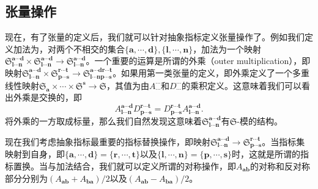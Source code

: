 \subsection{张量操作}

现在，有了张量的定义后，我们就可以针对抽象指标定义张量操作了。例如我们定义加法为，对两个不相交的集合$\{\boldsymbol{a} ,\cdots ,\boldsymbol{d}\} ,\{\boldsymbol{l} ,\cdots ,\boldsymbol{n}\}$，加法为一个映射$\mathfrak{S}_{\boldsymbol{l} \cdots \boldsymbol{n}}^{\boldsymbol{a} \cdots \boldsymbol{d}} \times \mathfrak{S}_{\boldsymbol{l} \cdots \boldsymbol{n}}^{\boldsymbol{a} \cdots \boldsymbol{d}}\rightarrow \mathfrak{S}_{\boldsymbol{l} \cdots \boldsymbol{n}}^{\boldsymbol{a} \cdots \boldsymbol{d}}$。一个重要的运算是所谓的外乘（outer multiplication），即映射$\mathfrak{S}_{\boldsymbol{l} \cdots \boldsymbol{n}}^{\boldsymbol{a} \cdots \boldsymbol{d}} \times \mathfrak{S}_{\boldsymbol{p} \cdots \boldsymbol{s}}^{\boldsymbol{r} \cdots \boldsymbol{t}}\rightarrow \mathfrak{S}_{\boldsymbol{l} \cdots \boldsymbol{np} \cdots \boldsymbol{s}}^{\boldsymbol{a} \cdots \boldsymbol{dr} \cdots \boldsymbol{t}}$。如果用第一类张量的定义，即外乘定义了一个多重线性映射$\mathfrak{S}_{\boldsymbol{a}} \times \cdots \times \mathfrak{S}^{\boldsymbol{s}}\rightarrow \mathfrak{S}$，其值为由$A_{\cdots }^{\cdots }$和$D_{\cdots }^{\cdots }$的乘积定义。这意味着我们可以看出外乘是交换的，即
\begin{equation*}
	A_{\boldsymbol{l} \cdots \boldsymbol{n}}^{\boldsymbol{a} \cdots \boldsymbol{d}} D_{\boldsymbol{p} \cdots \boldsymbol{s}}^{\boldsymbol{r} \cdots \boldsymbol{t}} =D_{\boldsymbol{p} \cdots \boldsymbol{s}}^{\boldsymbol{r} \cdots \boldsymbol{t}} A_{\boldsymbol{l} \cdots \boldsymbol{n}}^{\boldsymbol{a} \cdots \boldsymbol{d}} .
\end{equation*}
将外乘的一方取成标量，那么我们自然发现这意味着$\mathfrak{S}_{\boldsymbol{l} \cdots \boldsymbol{n}}^{\boldsymbol{a} \cdots \boldsymbol{d}}$有$\mathfrak{S}$-模的结构。



现在我们考虑抽象指标最重要的指标替换操作，即映射$\mathfrak{S}_{\boldsymbol{l} \cdots \boldsymbol{n}}^{\boldsymbol{a} \cdots \boldsymbol{d}}\rightarrow \mathfrak{S}_{\boldsymbol{p} \cdots \boldsymbol{s}}^{\boldsymbol{r} \cdots \boldsymbol{t}}$。当指标集映射到自身，即$\{\boldsymbol{a} ,\cdots ,\boldsymbol{d}\} =\{\boldsymbol{r} ,\cdots ,\boldsymbol{t}\}$以及$\{\boldsymbol{l} ,\cdots ,\boldsymbol{n}\} =\{\boldsymbol{p} ,\cdots ,\boldsymbol{s}\}$时，这就是所谓的指标置换。当与加法结合，我们就可以定义所谓的对称操作，即$A_{\boldsymbol{ab}}$的对称和反对称部分分别为$( A_{\boldsymbol{ab}} +A_{\boldsymbol{ba}}) /2$以及$ $$( A_{\boldsymbol{ab}} -A_{\boldsymbol{ba}}) /2$。 

